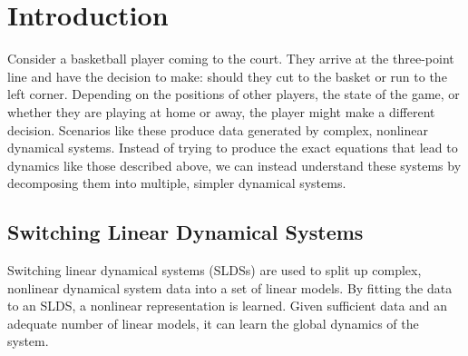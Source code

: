 
\section{Introduction}

Consider a basketball player coming to the court. They arrive at the three-point line and have the decision to make: should they cut to the basket or run to the left corner. Depending on the positions of other players, the state of the game, or whether they are playing at home or away, the player might make a different decision. Scenarios like these produce data generated by complex, nonlinear dynamical systems. Instead of trying to produce the exact equations that lead to dynamics like those described above, we can instead understand these systems by decomposing them into multiple, simpler dynamical systems.

\begin{comment}
The literature shows that this method is able to estimate complex nonlinear dynamics. With an increase in performance by extending the SLDS to recursive SLDS (rSLDS). The goal of this paper is to investigate if rSLDS is able to capture bifurcations efficiently. To investigate this we take a look at different systems where we know the dynamics and the bifurcations in it. We have chosen to look at a Hopf bifurcation in the Van der Pol oscillator additionally we studied the normal form of the Bautin bifurcation. 


The report is structured in the following manner, below we introduce the mathematical framework and findings described in the paper. In section 2 we reproduce some results presented in the paper. The third section is our results of the investigation on bifurcation and finally, Section 4 concludes our findings and discusses limitations and potential future research directions.
\end{comment}

\subsection{Switching Linear Dynamical Systems}

Switching linear dynamical systems (SLDSs) are used to split up complex, nonlinear dynamical system data into a set of linear models. By fitting the data to an SLDS, a nonlinear representation is learned. Given sufficient data and an adequate number of linear models, it can learn the global dynamics of the system.

